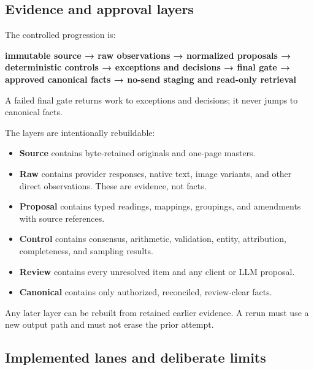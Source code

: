 \documentclass[
]{article}
\providecommand{\tightlist}{%
  \setlength{\itemsep}{0pt}\setlength{\parskip}{0pt}}
\begin{document}
\subsection{Evidence and approval
layers}\label{evidence-and-approval-layers}

The controlled progression is:

\textbf{immutable source → raw observations → normalized proposals →
deterministic controls → exceptions and decisions → final gate →
approved canonical facts → no-send staging and read-only retrieval}

A failed final gate returns work to exceptions and decisions; it never
jumps to canonical facts.

The layers are intentionally rebuildable:

\begin{itemize}
\tightlist
\item
  \textbf{Source} contains byte-retained originals and one-page masters.
\item
  \textbf{Raw} contains provider responses, native text, image variants,
  and other direct observations. These are evidence, not facts.
\item
  \textbf{Proposal} contains typed readings, mappings, groupings, and
  amendments with source references.
\item
  \textbf{Control} contains consensus, arithmetic, validation, entity,
  attribution, completeness, and sampling results.
\item
  \textbf{Review} contains every unresolved item and any client or LLM
  proposal.
\item
  \textbf{Canonical} contains only authorized, reconciled, review-clear
  facts.
\end{itemize}

Any later layer can be rebuilt from retained earlier evidence. A rerun
must use a new output path and must not erase the prior attempt.

\subsection{Implemented lanes and deliberate
limits}\label{implemented-lanes-and-deliberate-limits}
\end{document}
